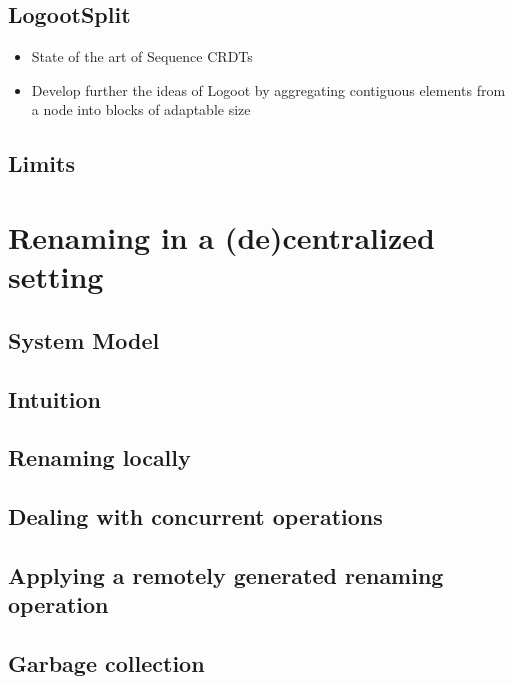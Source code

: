 \documentclass{article}
\begin{document}
\subsection{LogootSplit \cite{AndreCollaborateCom2013}}

\begin{itemize}
    \item State of the art of Sequence \acp{CRDT}
    \item Develop further the ideas of Logoot by aggregating contiguous elements from a node into blocks of adaptable size 
\end{itemize}

\subsection{Limits}


\section{Renaming in a (de)centralized setting}

\subsection{System Model}
\subsection{Intuition}
\subsection{Renaming locally}
\subsection{Dealing with concurrent operations}
\subsection{Applying a remotely generated renaming operation}
\subsection{Garbage collection}
\end{document}
